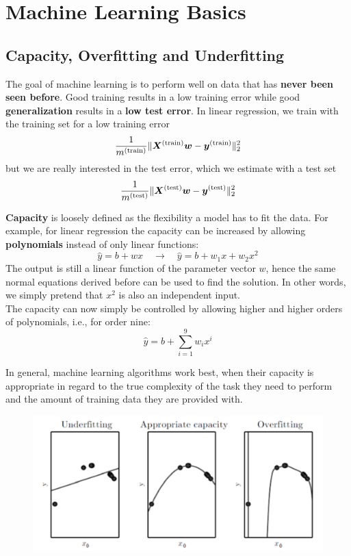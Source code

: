 \section{Machine Learning Basics}
\begin{multicols}{2}
	\subsection{Capacity, Overfitting and Underfitting}
	The goal of machine learning is to perform well on data that has \textbf{never been seen before}.
	Good training results in a low training error while good \textbf{generalization} results in a \textbf{low test error}.
	In linear regression, we train with the training set for a low training error
	\[ \frac{1}{m^{\text{(train)}}} \lVert \bol{X}^{\text{(train)}}\bol{w}-\bol{y}^{\text{(train)}} \rVert_2^2 \]
	but we are really interested in the test error, which we estimate with a test set
	\[ \frac{1}{m^{\text{(test)}}} \lVert \bol{X}^{\text{(test)}}\bol{w}-\bol{y}^{\text{(test)}} \rVert_2^2 \]

	\textbf{Capacity} is loosely defined as the flexibility a model has to fit the data.
	For example, for linear regression the capacity can be increased by allowing \textbf{polynomials} instead of only linear functions:
	\[ \hat{y} = b + wx \quad\rightarrow\quad \hat{y} = b + w_1x + w_2x^2 \]
	The output is still a linear function of the parameter vector $w$, hence the same normal equations derived before can be used to find the solution.
	In other words, we simply pretend that $x^2$ is also an independent input.\\
	The capacity can now simply be controlled by allowing higher and higher orders of polynomials, i.e., for order nine:
	\[ \hat{y} = b + \sum_{i=1}^{9} w_ix^i \]

	In general, machine learning algorithms work best, when their capacity is appropriate in regard to the true complexity of the task they need to perform and the amount of training data they are provided with.
	\begin{figure}[H]
		\centering
		\includegraphics[width=0.85\linewidth]{images/capacity.PNG}
	\end{figure}


\end{multicols}
